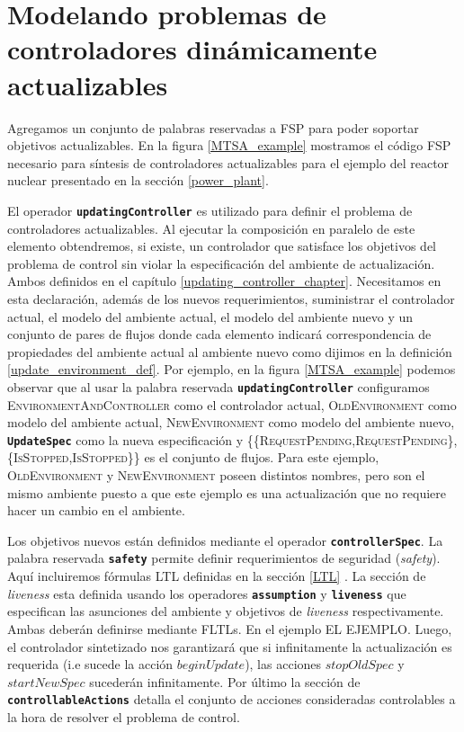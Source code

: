 \section{Modelando problemas de controladores dinámicamente actualizables}

Agregamos un conjunto de palabras reservadas a FSP para poder soportar objetivos actualizables. En la figura
\ref{MTSA_example} mostramos el código FSP necesario para síntesis de controladores actualizables para el ejemplo del reactor nuclear
presentado en la sección \ref{power_plant}.

El operador \texttt{\textbf{updatingController}} es utilizado para definir el problema de controladores
actualizables. Al ejecutar la composición en paralelo de este elemento obtendremos, si existe, un controlador que satisface los
objetivos del problema de control sin violar la especificación del ambiente de actualización. Ambos definidos en el
capítulo \ref{updating_controller_chapter}. Necesitamos en esta declaración, además de los nuevos requerimientos, suministrar
el controlador actual, el modelo del ambiente actual, el modelo del ambiente nuevo y un conjunto de pares de flujos
donde cada elemento indicará correspondencia de propiedades del ambiente actual al ambiente nuevo como dijimos en la
definición \ref{update_environment_def}. Por ejemplo, en la figura \ref{MTSA_example} podemos observar que al usar la
palabra reservada \texttt{\textbf{updatingController}} configuramos \textsc{EnvironmentAndController} como el
controlador actual, \textsc{OldEnvironment} como modelo del ambiente actual, \textsc{NewEnvironment} como modelo del
ambiente nuevo, \texttt{\textbf{UpdateSpec}} como la nueva especificación y \textsc{\{\{RequestPending,RequestPending\},
\{IsStopped,IsStopped\}\}} es el conjunto de flujos. Para este ejemplo, \textsc{OldEnvironment} y
\textsc{NewEnvironment} poseen distintos nombres, pero son el mismo ambiente puesto a que este ejemplo es una
actualización que no requiere hacer un cambio en el ambiente.

Los objetivos nuevos están definidos mediante el operador \texttt{\textbf{controllerSpec}}. La palabra reservada
\texttt{\textbf{safety}} permite definir requerimientos de seguridad (\emph{safety}). Aquí incluiremos fórmulas
LTL definidas en la sección \ref{LTL} . La sección de \emph{liveness} esta definida usando los operadores \texttt{\textbf{assumption}} y
\texttt{\textbf{liveness}} que especifican las asunciones del ambiente y objetivos de \emph{liveness} respectivamente.
Ambas deberán definirse mediante FLTLs. En el ejemplo EL EJEMPLO. Luego, el controlador sintetizado nos garantizará que
si infinitamente la actualización es requerida (i.e sucede la acción $beginUpdate$), las acciones $stopOldSpec$ y
$startNewSpec$ sucederán infinitamente. Por último la sección de \texttt{\textbf{controllableActions}} detalla el
conjunto de acciones consideradas controlables a la hora de resolver el problema de control.


